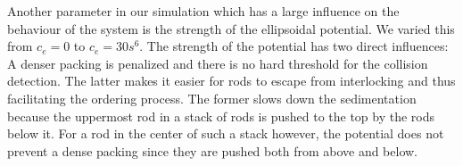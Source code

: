 Another parameter in our simulation which has a large influence on the behaviour of the system is the strength of the ellipsoidal potential. We varied this from $c_e =0$ to $c_e=30s^6$. The strength of the potential has two direct influences: A denser packing is penalized and  there is no hard threshold for the collision detection. The latter makes it easier for rods to escape from interlocking and thus facilitating the ordering process. The former slows down the sedimentation because the uppermost rod in  a stack of rods is pushed to the top by the rods below it. For a rod in the center of such a stack however, the potential does not prevent a dense packing since they are pushed both from above and below.   
